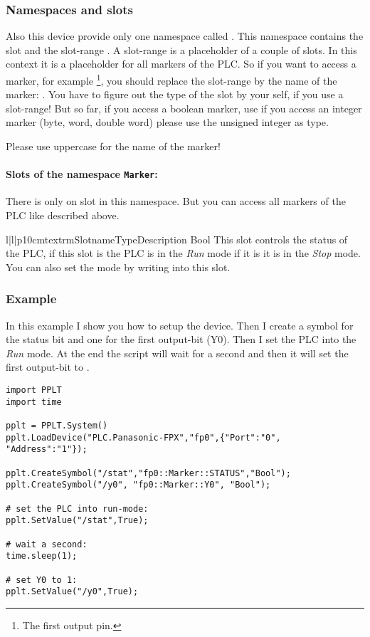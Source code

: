 \subsubsection{Namespaces and slots}
Also this device provide only one namespace called . This 
namespace contains the slot  and the slot-range . A
slot-range is a placeholder of a couple of slots. In this context it is a
placeholder for all markers of the PLC. So if you want to access a marker,
for example \footnote{The first output pin.}, you should replace
the slot-range by the name of the marker: . 
You have to figure out the type of the slot by your self, if you use
a slot-range! But so far, if you access a boolean marker, use 
if you access an integer marker (byte, word, double word) please use 
the unsigned integer  as type.
\begin{notice}
Please use uppercase for the name of the marker!
\end{notice}

\paragraph{Slots of the namespace \texttt{Marker}:}
There is only on slot in this namespace. But you can access all markers 
of the PLC like described above.
\begin{tableiii}{l|l|p{10cm}}{textrm}{Slotname}{Type}{Description}
        {Bool}
        {This slot controls the status of the PLC, if this slot is 
         the PLC is in the \emph{Run} mode if it is
         it is in the \emph{Stop} mode. You can also
        set the mode by writing into this slot.}
\end{tableiii}

\subsubsection{Example}
In this example I show you how to setup the  
device. Then I create a symbol for the status bit and one for the first 
output-bit (Y0). Then I set the PLC into the \emph{Run} mode. At the end the
script will wait for a second and then it will set the first output-bit
to .

\begin{verbatim}
import PPLT
import time

pplt = PPLT.System()
pplt.LoadDevice("PLC.Panasonic-FPX","fp0",{"Port":"0", "Address":"1"});

pplt.CreateSymbol("/stat","fp0::Marker::STATUS","Bool");
pplt.CreateSymbol("/y0", "fp0::Marker::Y0", "Bool");

# set the PLC into run-mode:
pplt.SetValue("/stat",True);

# wait a second:
time.sleep(1);

# set Y0 to 1:
pplt.SetValue("/y0",True);
\end{verbatim}






